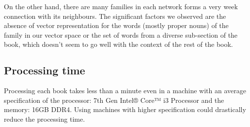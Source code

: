 \documentclass[11pt,a4paper]{article}
\begin{document}
On the other hand, there are many families in each network forms a very week connection with its neighbours. The significant factors we observed are the absence of vector representation for the words (mostly proper nouns) of the family in our vector space or the set of words from a diverse sub-section of the book, which doesn't seem to go well with the context of the rest of the book.

\subsection{Processing time}
Processing each book takes less than a minute even in a machine with an average specification of the processor: 7th Gen Intel® Core™ i3 Processor and the memory: 16GB DDR4. Using machines with higher specification could drastically reduce the processing time.
\end{document}
